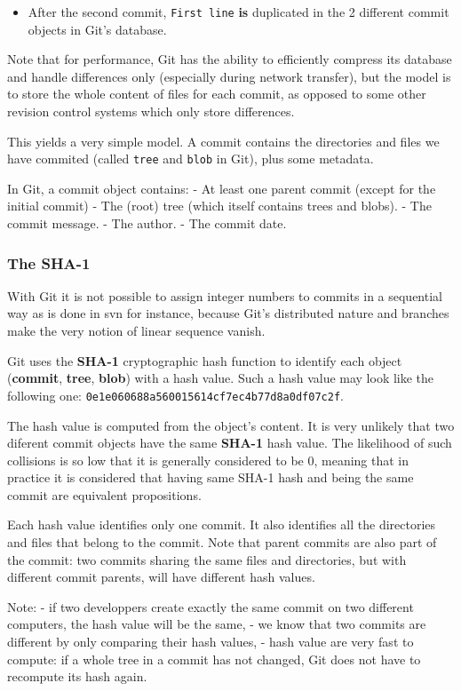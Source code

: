 \documentclass{article}
\begin{document}
\begin{itemize}
\item
  After the second commit, \texttt{First line} \textbf{is} duplicated in
  the 2 different commit objects in Git's database.
\end{itemize}
Note that for performance, Git has the ability to efficiently compress
its database and handle differences only (especially during network
transfer), but the model is to store the whole content of files for each
commit, as opposed to some other revision control systems which only
store differences.

This yields a very simple model. A commit contains the directories and
files we have commited (called \texttt{tree} and \texttt{blob} in Git),
plus some metadata.

In Git, a commit object contains: - At least one parent commit (except
for the initial commit) - The (root) tree (which itself contains trees
and blobs). - The commit message. - The author. - The commit date.


    \subsubsection{The SHA-1}


    With Git it is not possible to assign integer numbers to commits in a
sequential way as is done in svn for instance, because Git's distributed
nature and branches make the very notion of linear sequence vanish.

Git uses the \textbf{SHA-1} cryptographic hash function to identify each
object (\textbf{commit}, \textbf{tree}, \textbf{blob}) with a hash
value. Such a hash value may look like the following one:
\texttt{0e1e060688a560015614cf7ec4b77d8a0df07c2f}.

The hash value is computed from the object's content. It is very
unlikely that two diferent commit objects have the same \textbf{SHA-1}
hash value. The likelihood of such collisions is so low that it is
generally considered to be 0, meaning that in practice it is considered
that having same SHA-1 hash and being the same commit are equivalent
propositions.

Each hash value identifies only one commit. It also identifies all the
directories and files that belong to the commit. Note that parent
commits are also part of the commit: two commits sharing the same files
and directories, but with different commit parents, will have different
hash values.

Note: - if two developpers create exactly the same commit on two
different computers, the hash value will be the same, - we know that two
commits are different by only comparing their hash values, - hash value
are very fast to compute: if a whole tree in a commit has not changed,
Git does not have to recompute its hash again.
\end{document}
